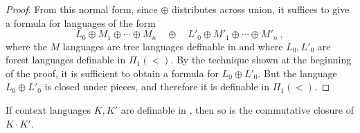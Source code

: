 \documentclass{LMCS}
\begin{document}
\begin{proof}
From this normal form, since $\oplus$ distributes across union, it
suffices to give a \Stwo formula for languages of the form
  \[
L_0 \oplus M_1 \oplus \cdots \oplus M_n \quad \oplus \quad      L'_0
\oplus M'_1 \oplus \cdots \oplus M'_n\ ,
  \]
  where the $M$ languages are tree languages definable in \Stwo and where
  $L_0,L'_0$ are forest languages definable in $\Pi_1(<)$. By the technique
  shown at the beginning of the proof, it is sufficient to obtain a formula for
  $L_0 \oplus L'_0$. But the language $L_0 \oplus L'_0$ is closed under pieces,
  and therefore it is definable in $\Pi_1(<)$.
\end{proof}

\begin{lem}
  If context languages $K,K'$ are definable in \Stwo,  then so is the
  commutative closure of $K\cdot K'$.
\end{lem}
\end{document}

